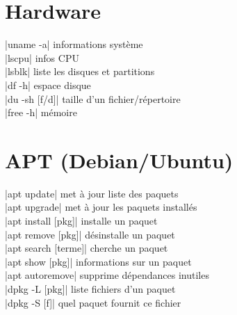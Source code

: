 \documentclass[9pt]{extarticle}
\newenvironment{cmdblock}{%
  \par\setlength{\parindent}{0pt}\setlength{\parskip}{0pt}%
  \RaggedRight%
}{\par}
\begin{document}
\begin{multicols}{4}
\section*{Hardware}

\begin{cmdblock}
\code|uname -a| \quad informations système \\
\code|lscpu| \quad infos CPU \\
\code|lsblk| \quad liste les disques et partitions \\
\code|df -h| \quad espace disque \\
\code|du -sh [f/d]| \quad taille d'un fichier/répertoire \\
\code|free -h| \quad mémoire \\
\end{cmdblock}

\section*{APT (Debian/Ubuntu)}
\begin{cmdblock}
\code|apt update| \quad met à jour liste des paquets \\
\code|apt upgrade| \quad met à jour les paquets installés \\
\code|apt install [pkg]| \quad installe un paquet \\
\code|apt remove [pkg]| \quad désinstalle un paquet \\
\code|apt search [terme]| \quad cherche un paquet \\
\code|apt show [pkg]| \quad informations sur un paquet \\
\code|apt autoremove| \quad supprime dépendances inutiles \\
\code|dpkg -L [pkg]| \quad liste fichiers d'un paquet \\
\code|dpkg -S [f]| \quad quel paquet fournit ce fichier \\
\end{cmdblock}



\end{multicols}
\end{document}
